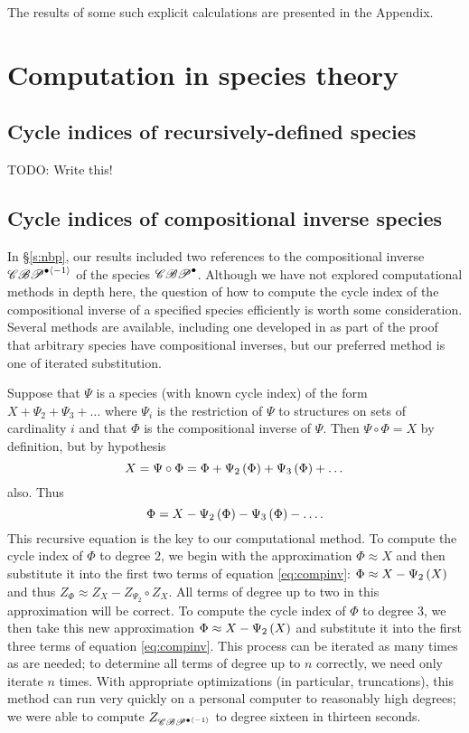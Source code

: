 \documentclass[sectionflow,singlespace,twoside,boldmathhdr]{brandiss} %
\numberwithin{section}{chapter}
\numberwithin{figure}{chapter}
\begin{document}
The results of some such explicit calculations are presented in the Appendix.

\appendix
\chapter{Computation in species theory}\label{c:comp}
\section{Cycle indices of recursively-defined species}\label{c:comprecurs}
TODO: Write this!

\section{Cycle indices of compositional inverse species}\label{s:compinv}
In \S \ref{s:nbp}, our results included two references to the compositional inverse $\mathscr{CBP}^{\bullet \left\langle {-1} \right\rangle}$ of the species $\mathscr{CBP}^{\bullet}$.
Although we have not explored computational methods in depth here, the question of how to compute the cycle index of the compositional inverse of a specified species efficiently is worth some consideration.
Several methods are available, including one developed in \cite[4.2.19]{bll:species} as part of the proof that arbitrary species have compositional inverses, but our preferred method is one of iterated substitution.

Suppose that $\Psi$ is a species (with known cycle index) of the form $X + \Psi_{2} + \Psi_{3} + \dots$ where $\Psi_{i}$ is the restriction of $\Psi$ to structures on sets of cardinality $i$ and that $\Phi$ is the compositional inverse of $\Psi$.
Then $\Psi \circ \Phi = X$ by definition, but by hypothesis
\begin{equation*}
  X = \Psi \circ \Phi = \Phi + \Psi_{2} \left( {\Phi} \right) + \Psi_{3} \left( {\Phi} \right) + \dots
\end{equation*}
also. Thus
\begin{equation}
  \label{eq:compinv}
  \Phi = X - \Psi_{2} \left( {\Phi} \right) - \Psi_{3} \left( {\Phi} \right) - \dots.
\end{equation}
This recursive equation is the key to our computational method.
To compute the cycle index of $\Phi$ to degree $2$, we begin with the approximation $\Phi \approx X$ and then substitute it into the first two terms of equation \eqref{eq:compinv}: $\Phi \approx X - \Psi_{2} \left( {X} \right)$ and thus $Z_{\Phi} \approx Z_{X} - Z_{\Psi_{2}} \circ Z_{X}$.
All terms of degree up to two in this approximation will be correct.
To compute the cycle index of $\Phi$ to degree $3$, we then take this new approximation $\Phi \approx X - \Psi_{2} \left( {X} \right)$ and substitute it into the first three terms of equation \eqref{eq:compinv}.
This process can be iterated as many times as are needed; to determine all terms of degree up to $n$ correctly, we need only iterate $n$ times.
With appropriate optimizations (in particular, truncations), this method can run very quickly on a personal computer to reasonably high degrees; we were able to compute $Z_{\mathscr{CBP}^{\bullet \left\langle {-1} \right\rangle}}$ to degree sixteen in thirteen seconds.
\end{document}
